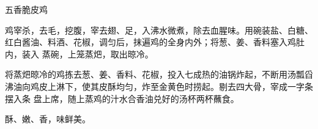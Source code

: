 %
%
%
%
%
%
%
\begin{recipe}{五香脆皮鸡}

\ingredients


\preparation

\step 鸡宰杀，去毛，挖腹，宰去翅、足，入沸水微煮，除去血腥味。用碗装盐、白糖、
红白酱油、料酒、花椒，调匀后，抹遍鸡的全身内外；将葱、姜、香料塞入鸡肚内，装入
蒸碗，上笼蒸𤆵，取出晾冷。

\step 将蒸𤆵晾冷的鸡拣去葱、姜、香料、花椒，投入七成热的油锅炸起，不断用汤瓢舀
沸油向鸡皮上淋下，使其皮酥均匀，炸至金黄色时捞起。剔去四大骨，宰成一字条摆入条
盘上席，随上蒸鸡的汁水合香油兑好的汤杯两杯蘸食。

\features

酥、嫩、香，味鲜美。

\end{recipe}

